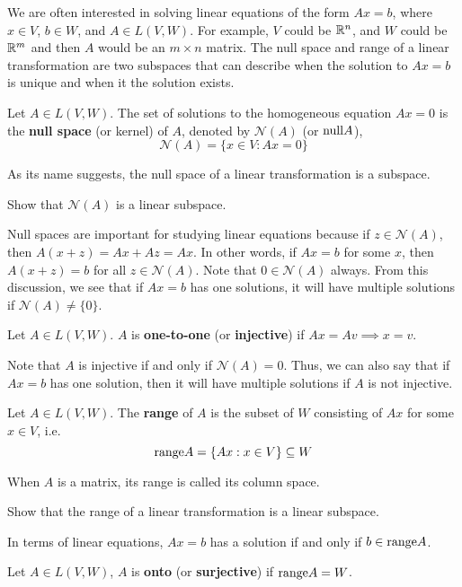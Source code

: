 We are often interested in solving linear equations of the form $A x =
b$, where $x \in V$, $b \in W$, and $A \in L(V,W)$. For example, $V$
could be $\mathbb{R}^n$, and $W$ could be $\mathbb{R}^m$ and then $A$ would be an $m
\times n$ matrix. The null space and range of a linear transformation
are two subspaces that can describe when the solution to $Ax=b$ is
unique and when it the solution exists.

\begin{definition}
  Let $A \in L(V,W)$. The set of solutions to the homogeneous
  equation $Ax = 0$ is the \textbf{null space} (or kernel) of
  $A$, denoted by $\mathcal{N}(A)$ (or $\mathrm{null} A$),
  \[ \mathcal{N}(A) = \{x \in V: Ax = 0 \} \]
\end{definition}
As its name suggests, the null space of a linear transformation is a
subspace.
\begin{exercise}
  Show that $\mathcal{N}(A)$ is a linear subspace.
\end{exercise}
Null spaces are important for studying linear equations because if $z
\in \mathcal{N}(A)$, then $A (x + z) = Ax + A z = Ax$. In other words,
if $Ax = b$ for some $x$, then $A(x+z) = b$ for all $z \in
\mathcal{N}(A)$. Note that $0 \in \mathcal{N}(A)$ always. From this
discussion, we see that if $A x = b$ has one solutions, it will have
multiple solutions if $\mathcal{N}(A) \neq \{0 \}$.
\begin{definition}
  Let $A \in L(V,W)$. $A$ is \textbf{one-to-one} (or
  \textbf{injective}) if $Ax = A v \implies x = v$.
\end{definition}
Note that $A$ is injective if and only if $\mathcal{N}(A) = 0$. Thus,
we can also say that if $A x = b$ has one solution, then it will have
multiple solutions if $A$ is not injective.

\begin{definition}
  Let $A \in L(V,W)$. The \textbf{range} of $A$ is the subset of $W$
  consisting of $A x$ for some $x \in V$, i.e.
  \[ \mathrm{range} A = \{ Ax: x \in V \} \subseteq W \]
\end{definition}
When $A$ is a matrix, its range is called its column space. 
\begin{exercise}
  Show that the range of a linear transformation is a linear subspace.
\end{exercise}
In terms of linear equations, $Ax = b$ has a solution if and only if
$b \in \mathrm{range} A$. 
\begin{definition}
  Let $A \in L(V,W)$, $A$ is \textbf{onto} (or \textbf{surjective}) if
  $\mathrm{range} A = W$.
\end{definition}

